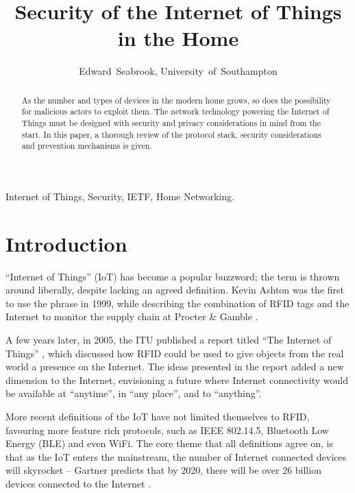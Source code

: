 \documentclass[10pt,journal,compsoc]{IEEEtran}
\begin{document}
\title{Security of the Internet of Things in the Home}
\author{Edward~Seabrook, University~of~Southampton }

\maketitle

\begin{abstract}
As the number and types of devices in the modern home grows, so does the
possibility for malicious actors to exploit them. The network technology
powering the Internet of Things must be designed with security and privacy
considerations in mind from the start. In this paper, a thorough review of the
protocol stack, security considerations and prevention mechanisms is given. 
\end{abstract}

\begin{IEEEkeywords}
Internet of Things, Security, IETF, Home Networking.
\end{IEEEkeywords}

\IEEEpeerreviewmaketitle

\section{Introduction}
 ``Internet of Things'' (IoT) has become a popular
buzzword; the term is thrown around liberally, despite lacking an agreed
definition. Kevin Ashton was the first to use the phrase in 1999, while
describing the combination of RFID tags and the Internet to monitor the supply
chain at Procter \& Gamble \cite{Ashton2009}. 

A few years later, in 2005, the ITU published a report titled ``The Internet of
Things'' \cite{ITU_IoT}, which discussed how RFID could be used to give objects
from the real world a presence on the Internet. The ideas presented in the
report added a new dimension to the Internet, envisioning a future where
Internet connectivity would be available at ``anytime'', in ``any place'', and
to ``anything''.

More recent definitions of the IoT have not limited themselves to RFID,
favouring more feature rich protocols, such as IEEE 802.14.5, Bluetooth Low
Energy (BLE) and even WiFi. The core theme that all definitions agree on, is
that as the IoT enters the mainstream, the number of Internet connected devices
will skyrocket -- Gartner predicts that by 2020, there will be over 26 billion
devices connected to the Internet \cite{Gartner2014}. 
\end{document}
